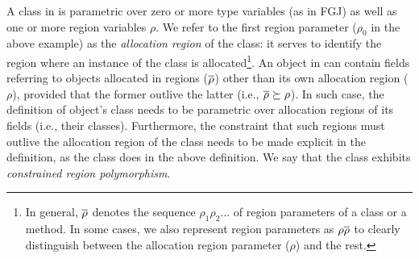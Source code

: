 A class in \FB is parametric over zero or more type variables (as in
FGJ) as well as one or more region variables $\rho$.
We refer to the first region parameter ($\rho_0$ in the above example)
as the \emph{allocation region} of the class: it serves to identify
the region where an instance of the class is allocated\footnote{In
general, $\overline{\rho}$ denotes the sequence $\rho_1\rho_2...$ of region
parameters of a class or a method. In some cases, we also represent
region parameters as $\rho\overline{\rho}$ to clearly distinguish between the
allocation region parameter ($\rho$) and the rest.}.
%
An object in \FB can contain fields referring to objects allocated in
regions ($\overline{\rho}$) other than its own allocation region ($\rho$),
provided that the former outlive the latter (i.e., $\overline{\rho} \succeq
\rho$). In such case, the definition of object's class needs to be
parametric over allocation regions of its fields (i.e., their
classes). Furthermore, the constraint that such regions must outlive
the allocation region of the class needs to be made explicit in the
definition, as the  class does in the above definition. We say
that the  class exhibits \emph{constrained region
polymorphism}.
%

